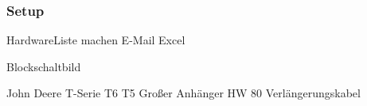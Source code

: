 

\subsubsection*{Setup}


HardwareListe machen E-Mail Excel

Blockschaltbild

John Deere T-Serie T6 T5
Großer Anhänger HW 80
Verlängerungskabel
